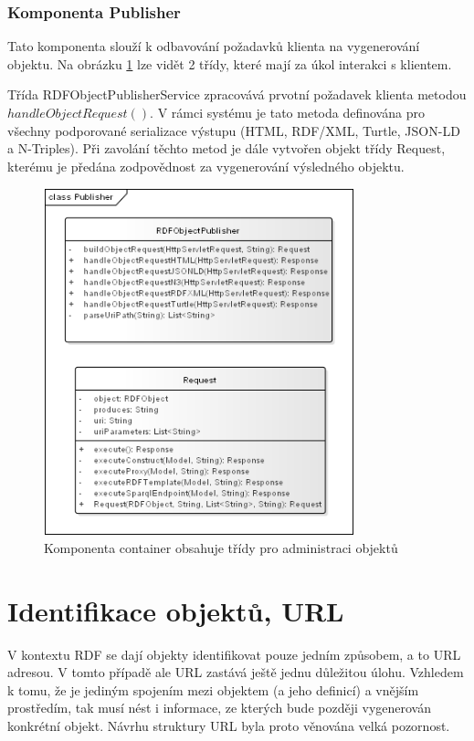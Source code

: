 \documentclass[thesis=B,czech]{FITthesis}[2012/06/26]
\begin{document}
    \subsubsection{Komponenta Publisher}
    Tato komponenta slouží k odbavování požadavků klienta na vygenerování objektu. Na obrázku \ref{publisher_class} lze vidět 2 třídy,
    které mají za úkol interakci s klientem.
    
    Třída RDFObjectPublisherService zpracovává prvotní požadavek klienta metodou $handleObjectRequest()$. V rámci systému je tato metoda definována
    pro všechny podporované serializace výstupu (HTML, RDF/XML, Turtle, JSON-LD a N-Triples). Při zavolání těchto metod je dále vytvořen 
    objekt třídy Request, kterému je předána zodpovědnost za vygenerování výsledného objektu. 
    
    \begin{figure}\centering
 	\includegraphics[width=0.8\textwidth]{publisher_class}
 	\caption[Model tříd]{Komponenta container obsahuje třídy pro administraci objektů}\label{publisher_class}
    \end{figure}
    
    
   \newpage
   
   
 
 \section{Identifikace objektů, URL}
 \label{sec:identifikace}
 V kontextu RDF se dají objekty identifikovat pouze jedním způsobem, a to URL adresou. V tomto případě ale URL zastává ještě jednu důležitou úlohu.
 Vzhledem k tomu, že je jediným spojením mezi objektem (a jeho definicí) a vnějším prostředím, tak musí nést i informace, ze kterých bude později vygenerován
 konkrétní objekt. Návrhu struktury URL byla proto věnována velká pozornost.
 
\end{document}
